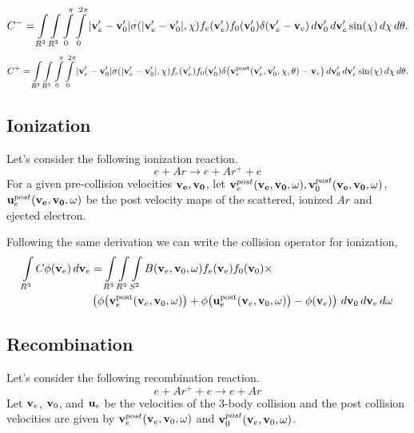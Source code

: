 \documentclass{article}[draft]
\begin{document}
\begin{align*}
C^- = \myint_{R^3} \myint_{R^3} \myint_{0}^{\pi} \myint_{0}^{2\pi} 
|\vect{v}_e^\prime-\vect{v}_0^\prime| \sigma\of{|\vect{v}_e^\prime-\vect{v}_0^\prime|, \chi}
f_e\of{\vect{v}_e^\prime} f_0\of{\vect{v}_0^\prime} 
\delta\of{\vect{v}_e^\prime - \vect{v}_e} 
\diff{\vect{v}_0^\prime} \diff{\vect{v}_e^\prime} \sin\of{\chi} \diff{\chi} \diff{\theta}.
\end{align*}
\begin{align*}
C^+ = \myint_{R^3} \myint_{R^3} \myint_{0}^{\pi} \myint_{0}^{2\pi} 
|\vect{v}_e^\prime-\vect{v}_0^\prime| \sigma\of{|\vect{v}_e^\prime-\vect{v}_0^\prime|, \chi}
f_e\of{\vect{v}_e^\prime} f_0\of{\vect{v}_0^\prime} 
\delta\of{\vect{v}_e^\text{post}\of{\vect{v}_e^\prime, \vect{v}_0^\prime, \chi, \theta} - \vect{v}_e} 
\diff{\vect{v}_0^\prime} \diff{\vect{v}_e^\prime} \sin\of{\chi} \diff{\chi} \diff{\theta}.
\end{align*}

\clearpage
\subsection{Ionization}
Let's consider the following ionization reaction. 
\begin{equation}
	e + Ar \rightarrow e + Ar^{+} + e
\end{equation}
For a given pre-collision velocities $\mathbf{v_e}, \mathbf{v_0}$, let $\mathbf{v}^{post}_e(\mathbf{v_e},\mathbf{v_0},\omega), \mathbf{v}^{post}_0(\mathbf{v_e},\mathbf{v_0},\omega)$, $\mathbf{u}^{post}_e(\mathbf{v_e},\mathbf{v_0},\omega)$ be the post velocity maps of the scattered, ionized $Ar$ and ejected electron.

Following the same derivation we can write the collision operator for ionization, 
\begin{align}
\myint_{R^3} C \phi\of{\vect{v}_e} \diff{\vect{v}_e} 
&=
\myint_{R^3} \myint_{R^3} \myint_{S^2} 
B\of{\vect{v}_e, \vect{v}_0, \vect{\omega}}
f_e\of{\vect{v}_e} f_0\of{\vect{v}_0} \times \\
&\left(
\phi\of{\vect{v}_e^\text{post}\of{\vect{v}_e, \vect{v}_0, \vect{\omega}}} +
\phi\of{\vect{u}_e^\text{post}\of{\vect{v}_e, \vect{v}_0, \vect{\omega}}} 
- \phi\of{\vect{v}_e} 
\right)
\diff{\vect{v}_0} \diff{\vect{v}_e} \diff{\vect{\omega}}
\end{align}  

\subsection{Recombination}
Let's consider the following recombination reaction. 
\begin{equation}
	e + Ar^{+} + e \rightarrow e + Ar
\end{equation}
Let $\mathbf{v}_e$, $\mathbf{v}_0$, and $\mathbf{u}_e$ be the velocities of the 3-body collision and the post collision velocities are given by $\mathbf{v}^{post}_e(\mathbf{v}_e,\mathbf{v}_0,\omega)$ and $\mathbf{v}^{post}_0(\mathbf{v}_e,\mathbf{v}_0,\omega)$.
\end{document}
